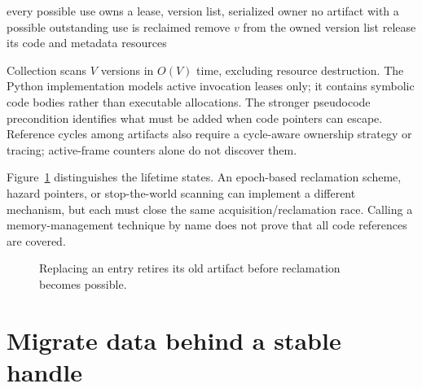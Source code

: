 \begin{algorithm}[htbp]
\caption{Reclaim retired artifacts in a lease-complete serialized model.}
\label{alg:ch67-collect}
\begin{pseudocode}
\Require every possible use owns a lease, version list, serialized owner
\Ensure no artifact with a possible outstanding use is reclaimed
    \State remove $v$ from the owned version list
    \State release its code and metadata resources
  \EndIf
\EndFor
\end{pseudocode}
\end{algorithm}

Collection scans $V$ versions in $O(V)$ time, excluding resource destruction.
The Python implementation models active invocation leases only; it contains symbolic code bodies rather than executable allocations.
The stronger pseudocode precondition identifies what must be added when code pointers can escape.
Reference cycles among artifacts also require a cycle-aware ownership strategy or tracing; active-frame counters alone do not discover them.

Figure~\ref{fig:ch67-lifetime} distinguishes the lifetime states.
An epoch-based reclamation scheme, hazard pointers, or stop-the-world scanning can implement a different mechanism, but each must close the same acquisition/reclamation race.
Calling a memory-management technique by name does not prove that all code references are covered.

\begin{figure}[htbp]
\centering
{}
\caption{Replacing an entry retires its old artifact before reclamation becomes possible.}
\label{fig:ch67-lifetime}
\end{figure}

\section{Migrate data behind a stable handle}
\label{sec:ch67-migration}

